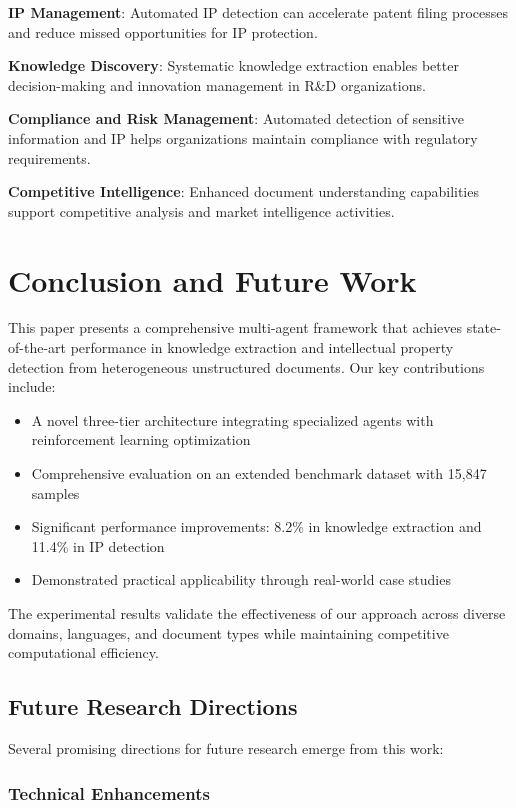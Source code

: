 \documentclass[11pt,a4paper]{article}
\begin{document}
\textbf{IP Management}: Automated IP detection can accelerate patent filing processes and reduce missed opportunities for IP protection.

\textbf{Knowledge Discovery}: Systematic knowledge extraction enables better decision-making and innovation management in R\&D organizations.

\textbf{Compliance and Risk Management}: Automated detection of sensitive information and IP helps organizations maintain compliance with regulatory requirements.

\textbf{Competitive Intelligence}: Enhanced document understanding capabilities support competitive analysis and market intelligence activities.

\section{Conclusion and Future Work}

This paper presents a comprehensive multi-agent framework that achieves state-of-the-art performance in knowledge extraction and intellectual property detection from heterogeneous unstructured documents. Our key contributions include:

\begin{itemize}
  \item A novel three-tier architecture integrating specialized agents with reinforcement learning optimization
  \item Comprehensive evaluation on an extended benchmark dataset with 15,847 samples
  \item Significant performance improvements: 8.2\% in knowledge extraction and 11.4\% in IP detection
  \item Demonstrated practical applicability through real-world case studies
\end{itemize}

The experimental results validate the effectiveness of our approach across diverse domains, languages, and document types while maintaining competitive computational efficiency.

\subsection{Future Research Directions}

Several promising directions for future research emerge from this work:

\subsubsection{Technical Enhancements}
\end{document}
